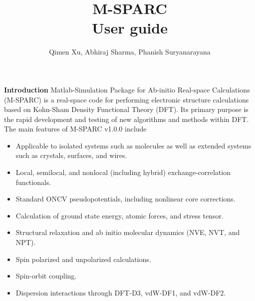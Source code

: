 \documentclass[xcolor=dvipsnames,t]{beamer}
\title[] {M-SPARC  \\ {\small User guide}}
\author{Qimen Xu, Abhiraj Sharma, Phanish Suryanarayana}
\institute[]
{
Material Physics \& Mechanics Group \\
Georgia Institute of Technology
}
\date{}
\let\otp\titlepage
\renewcommand{\titlepage}{\otp\addtocounter{framenumber}{-1}}
\begin{document}

\begin{frame}[plain]
 \titlepage
\end{frame}


\begin{frame}[allowframebreaks]{\textbf{Introduction}} \label{Introduction}
Matlab-Simulation Package for Ab-initio Real-space Calculations (M-SPARC) is a real-space code for performing electronic structure calculations based on Kohn-Sham Density Functional Theory (DFT). Its primary purpose is the rapid development and testing of new algorithms and methods within DFT. The main features of M-SPARC v1.0.0 include
\begin{itemize}
  \item Applicable to isolated systems such as molecules as well as extended systems such as crystals, surfaces, and wires.
  \item Local, semilocal, and nonlocal (including hybrid) exchange-correlation functionals.
  \item Standard ONCV pseudopotentials, including nonlinear core corrections.
  \item Calculation of ground state energy, atomic forces, and stress tensor.
  \item Structural relaxation and ab initio molecular dynamics (NVE, NVT, and NPT).
  \item Spin polarized and unpolarized calculations.
  \item Spin-orbit coupling.
  \item Dispersion interactions through DFT-D3, vdW-DF1, and vdW-DF2.
\end{itemize}

\end{frame}
\end{document}
